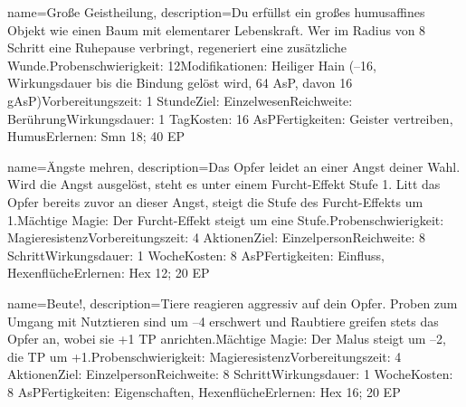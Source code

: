 {
    name={Große Geistheilung},
    description={Du erfüllst ein großes humusaffines Objekt wie einen Baum mit elementarer Lebenskraft. Wer im Radius von 8 Schritt eine Ruhepause verbringt, regeneriert eine zusätzliche Wunde.\newline Probenschwierigkeit: 12\newline Modifikationen: Heiliger Hain (–16, Wirkungsdauer bis die Bindung gelöst wird, 64 AsP, davon 16 gAsP)\newline Vorbereitungszeit: 1 Stunde\newline Ziel: Einzelwesen\newline Reichweite: Berührung\newline Wirkungsdauer: 1 Tag\newline Kosten: 16 AsP\newline Fertigkeiten: Geister vertreiben, Humus\newline Erlernen: Smn 18; 40 EP}
}


{
    name={Ängste mehren},
    description={Das Opfer leidet an einer Angst deiner Wahl. Wird die Angst ausgelöst, steht es unter einem Furcht-Effekt Stufe 1. Litt das Opfer bereits zuvor an dieser Angst, steigt die Stufe des Furcht-Effekts um 1.\newline Mächtige Magie: Der Furcht-Effekt steigt um eine Stufe.\newline Probenschwierigkeit: Magieresistenz\newline Vorbereitungszeit: 4 Aktionen\newline Ziel: Einzelperson\newline Reichweite: 8 Schritt\newline Wirkungsdauer: 1 Woche\newline Kosten: 8 AsP\newline Fertigkeiten: Einfluss, Hexenflüche\newline Erlernen: Hex 12; 20 EP}
}


{
    name={Beute!},
    description={Tiere reagieren aggressiv auf dein Opfer. Proben zum Umgang mit Nutztieren sind um –4 erschwert und Raubtiere greifen stets das Opfer an, wobei sie +1 TP anrichten.\newline Mächtige Magie: Der Malus steigt um –2, die TP um +1.\newline Probenschwierigkeit: Magieresistenz\newline Vorbereitungszeit: 4 Aktionen\newline Ziel: Einzelperson\newline Reichweite: 8 Schritt\newline Wirkungsdauer: 1 Woche\newline Kosten: 8 AsP\newline Fertigkeiten: Eigenschaften, Hexenflüche\newline Erlernen: Hex 16; 20 EP}
}


